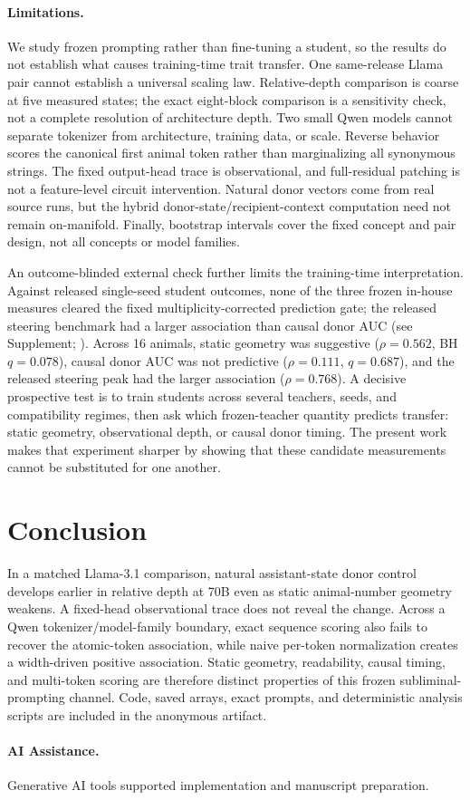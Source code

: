 \documentclass[letterpaper]{article}
\begin{document}
\paragraph{Limitations.}
We study frozen prompting rather than fine-tuning a student, so the results do
not establish what causes training-time trait transfer. One same-release Llama
pair cannot establish a universal scaling law. Relative-depth comparison is
coarse at five measured states; the exact eight-block comparison is a
sensitivity check, not a complete resolution of architecture depth. Two small
Qwen models cannot separate tokenizer from architecture, training data, or
scale. Reverse behavior scores the canonical first animal token rather than
marginalizing all synonymous strings. The fixed output-head trace is
observational, and full-residual patching is not a feature-level circuit
intervention. Natural donor vectors come from real source runs, but the hybrid
donor-state/recipient-context computation need not remain on-manifold. Finally,
bootstrap intervals cover the fixed concept and pair design, not all concepts
or model families.

An outcome-blinded external check further limits the training-time
interpretation. Against released single-seed student outcomes, none of the
three frozen in-house measures cleared the fixed multiplicity-corrected
prediction gate; the released steering benchmark had a larger association than
causal donor AUC (see Supplement; \citealp{blank2026steering}). Across 16 animals,
static geometry was suggestive ($\rho=0.562$, BH $q=0.078$), causal donor AUC
was not predictive ($\rho=0.111$, $q=0.687$), and the released steering peak
had the larger association ($\rho=0.768$). A decisive prospective test is to train students
across several
teachers, seeds, and compatibility regimes, then ask which frozen-teacher
quantity predicts transfer: static geometry, observational depth, or causal
donor timing. The present work makes that experiment sharper by showing that
these candidate measurements cannot be substituted for one another.

\section{Conclusion}

In a matched Llama-3.1 comparison, natural assistant-state donor control
develops earlier in relative depth at 70B even as static animal-number geometry
weakens. A fixed-head observational trace does not reveal the change. Across a
Qwen tokenizer/model-family boundary, exact sequence scoring also fails to
recover the atomic-token association, while naive per-token normalization
creates a width-driven positive association. Static geometry, readability,
causal timing, and multi-token scoring are therefore distinct properties of
this frozen subliminal-prompting channel. Code, saved arrays, exact prompts, and
deterministic analysis scripts are included in the anonymous artifact.

\paragraph{AI Assistance.}
Generative AI tools supported implementation and manuscript preparation.


\end{document}
